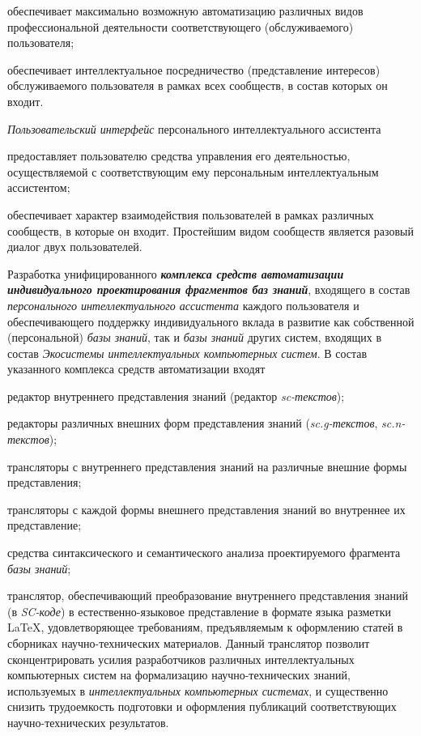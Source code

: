 \begin{textitemize}
\begin{textitemize}
		\item обеспечивает максимально возможную автоматизацию различных видов профессиональной   деятельности соответствующего (обслуживаемого) пользователя; 
		\item обеспечивает интеллектуальное посредничество (представление интересов) обслуживаемого пользователя в рамках всех сообществ, в состав которых он входит.
	\end{textitemize}
	\textit{Пользовательский интерфейс} персонального интеллектуального ассистента
	\begin{textitemize}
		\item предоставляет пользователю средства управления его  деятельностью, осуществляемой  с соответствующим ему персональным интеллектуальным ассистентом;
		\item обеспечивает  характер взаимодействия пользователей в рамках различных сообществ, в которые он входит. Простейшим видом сообществ является разовый диалог двух пользователей.
	\end{textitemize}
	\item
	Разработка унифицированного \textbf{\textit{комплекса средств автоматизации индивидуального проектирования фрагментов баз знаний}}, входящего в состав \textit{персонального интеллектуального ассистента} каждого пользователя и обеспечивающего поддержку индивидуального вклада в развитие как собственной (персональной) \textit{базы знаний}, так и \textit{базы знаний} других систем, входящих в состав \textit{Экосистемы интеллектуальных компьютерных систем}. В состав указанного комплекса средств автоматизации входят
	\begin{textitemize}
		\item редактор внутреннего представления знаний (редактор \textit{sc-текстов});
		\item редакторы различных внешних форм представления знаний (\textit{sc.g-текстов}, \textit{sc.n-текстов});
		\item трансляторы с внутреннего представления знаний на различные внешние формы представления;
		\item трансляторы с каждой формы внешнего представления знаний во внутреннее их представление;
		\item средства синтаксического и семантического анализа проектируемого фрагмента \textit{базы знаний};
		\item транслятор, обеспечивающий преобразование внутреннего представления знаний (в \textit{SC-коде}) в естествен\-но-языковое представление в формате языка разметки LaTeX, удовлетворяющее требованиям, предъявляемым к оформлению статей в сборниках научно-технических материалов. Данный транслятор позволит сконцентрировать усилия разработчиков различных интеллектуальных компьютерных систем на формализацию научно-технических знаний, используемых в \textit{интеллектуальных компьютерных системах}, и существенно снизить трудоемкость подготовки и оформления публикаций соответствующих научно-технических результатов.\\

\end{textitemize}
\end{textitemize}
